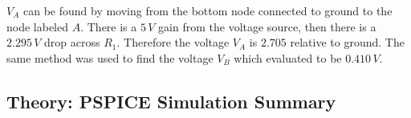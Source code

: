 \documentclass[11pt]{article}
\begin{document}
$V_A$ can be found by moving from the bottom node connected to ground to the node labeled $A$. There is a $5\,V$ gain from the voltage source, then there is a $2.295\,V$ drop across $R_1$. Therefore the voltage $V_A$ is $2.705$ relative to ground. The same method was used to find the voltage $V_B$ which evaluated to be $0.410\,V$.

\subsection{Theory: PSPICE Simulation Summary}
\end{document}
